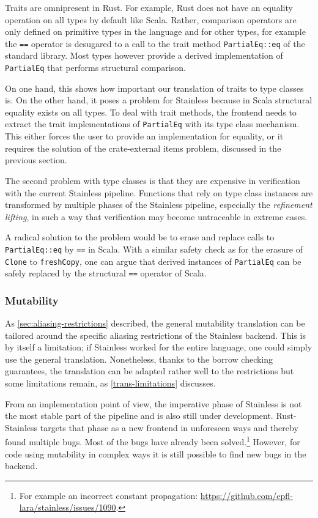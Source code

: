 Traits are omnipresent in Rust. For example, Rust does not have an equality
operation on all types by default like Scala. Rather, comparison operators are
only defined on primitive types in the language and for other types, for example
the \lstinline!==! operator is desugared to a call to the trait method
\lstinline!PartialEq::eq! of the standard library. Most types however provide a
derived implementation of \lstinline!PartialEq! that performs structural
comparison.

On one hand, this shows how important our translation of traits to type classes
is. On the other hand, it poses a problem for Stainless because in Scala
structural equality exists on all types. To deal with trait methods, the
frontend needs to extract the trait implementations of \lstinline!PartialEq!
with its type class mechanism. This either forces the user to provide an
implementation for equality, or it requires the solution of the crate-external
items problem, discussed in the previous section.

The second problem with type classes is that they are expensive in verification
with the current Stainless pipeline. Functions that rely on type class instances
are transformed by multiple phases of the Stainless pipeline, especially the
\emph{refinement lifting}, in such a way that verification may become
untraceable in extreme cases.

A radical solution to the problem would be to erase and replace calls to
\lstinline!PartialEq::eq! by \lstinline!==! in Scala. With a similar safety
check as for the erasure of \lstinline!Clone! to \lstinline!freshCopy!, one can
argue that derived instances of \lstinline!PartialEq! can be safely replaced by
the structural \lstinline!==! operator of Scala.

\subsubsection{Mutability}

As \autoref{sec:aliasing-restrictions} described, the general mutability
translation can be tailored around the specific aliasing restrictions of the
Stainless backend. This is by itself a limitation; if Stainless worked for the
entire language, one could simply use the general translation. Nonetheless,
thanks to the borrow checking guarantees, the translation can be adapted rather
well to the restrictions but some limitations remain, as
\autoref{trans-limitations} discusses.

From an implementation point of view, the imperative phase of Stainless is not
the most stable part of the pipeline and is also still under development.
Rust-Stainless targets that phase as a new frontend in unforeseen ways  and
thereby found multiple bugs. Most of the bugs have already been
solved.\footnote{For example an incorrect constant propagation:
\url{https://github.com/epfl-lara/stainless/issues/1090}.} However, for code
using mutability in complex ways it is still possible to find new bugs in the
backend.

